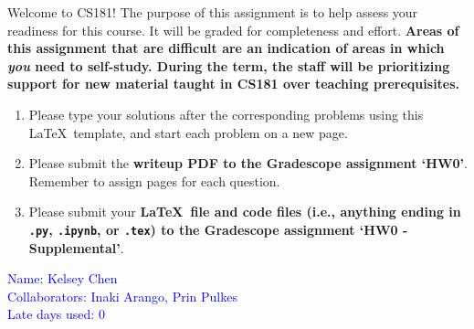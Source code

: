 \documentclass{harvardml}
\theoremstyle{definition}
\theoremstyle{plain}
\begin{document}
\noindent Welcome to CS181! The purpose of this assignment is to help assess your readiness for this course.  It will be graded for completeness and effort.  \textbf{Areas of this assignment that are difficult are an indication of areas in which \emph{you} need to self-study. During the term, the staff will be prioritizing support for new material taught in CS181 over teaching prerequisites.}

\begin{enumerate}
    \item Please type your solutions after the corresponding problems using this \LaTeX\ template, and start each problem on a new page.
    \item Please submit the \textbf{writeup PDF to the Gradescope assignment `HW0'}. Remember to assign pages for each question.
    \item Please submit your \textbf{\LaTeX\ file and code files (i.e., anything ending in \texttt{.py}, \texttt{.ipynb}, or \texttt{.tex}) to the Gradescope assignment `HW0 - Supplemental'}. 
\end{enumerate}

\noindent \textcolor{blue}{Name: Kelsey Chen \\ Collaborators: Inaki Arango, Prin Pulkes \\ Late days used: 0}
\end{document}
